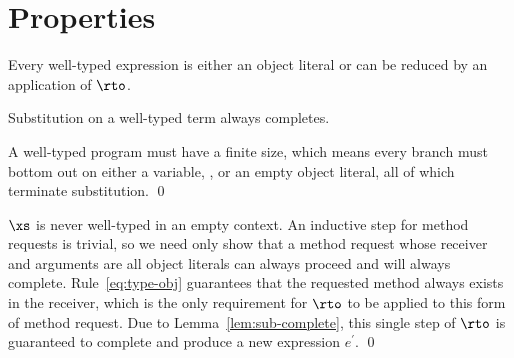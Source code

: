 \section{Properties}

\begin{theorem}[Progress]
\label{th:progress}

Every well-typed expression is either an object literal or can be reduced by an
application of $\rto$.

\begin{lemma}
\label{lem:sub-complete}

Substitution on a well-typed term always completes.

\begin{lproof}
A well-typed program must have a finite size, which means every branch must
bottom out on either a variable, \self, or an empty object literal, all of which
terminate substitution. \qed
\end{lproof}

\end{lemma}

\begin{tproof}

$\xs$ is never well-typed in an empty context.  An inductive step for method
requests is trivial, so we need only show that a method request whose receiver
and arguments are all object literals can always proceed and will always
complete.  Rule~\ref{eq:type-obj} guarantees that the requested method always
exists in the receiver, which is the only requirement for $\rto$ to be applied
to this form of method request.  Due to Lemma~\ref{lem:sub-complete}, this
single step of $\rto$ is guaranteed to complete and produce a new expression
$e^\prime$. \qed

\end{tproof}

\end{theorem}

